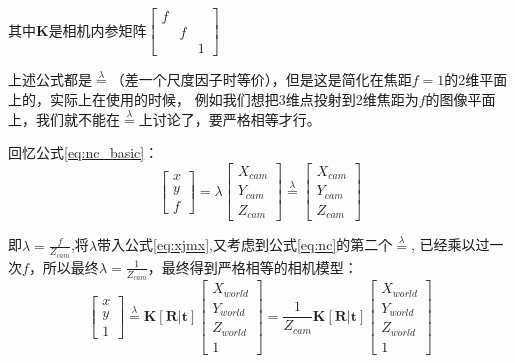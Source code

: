 \documentclass[12pt]{article}
\begin{document}
其中$\mathbf{K}$是相机内参矩阵$\left[\begin{array}{lll}
    f &&\\
    &f&\\
    &&1
\end{array}\right]$

上述公式都是$\overset{\lambda}{=}$（差一个尺度因子时等价），但是这是简化在焦距$f=1$的2维平面上的，实际上在使用的时候，
例如我们想把3维点投射到2维焦距为$f$的图像平面上，我们就不能在$\overset{\lambda}{=}$上讨论了，要严格相等才行。

回忆公式\ref{eq:nc_basic}：
\begin{equation}
    \nonumber
    \left[\begin{array}{l}
        x \\
        y \\
        f
        \end{array}\right]=\lambda\left[\begin{array}{l}
            X_{cam} \\
            Y_{cam} \\
            Z_{cam}
            \end{array}\right]
        \overset{\lambda}{=}\left[\begin{array}{l}
        X_{cam} \\
        Y_{cam} \\
        Z_{cam}
        \end{array}\right]
\end{equation}

即$\lambda=\frac{f}{Z_{cam}}$,将$\lambda$带入公式\ref{eq:xjmx},又考虑到公式\ref{eq:nc}的第二个$\overset{\lambda}{=}$,
已经乘以过一次$f$，所以最终$\lambda=\frac{1}{Z_{cam}}$，最终得到严格相等的相机模型：
\begin{equation}
    \left[
        \begin{array}{l}
            x \\
            y \\
            1
        \end{array}
    \right]\overset{\lambda}{=}
    \mathbf{K}\left[\mathbf{R|\mathbf{t}}\right]\left[
        \begin{array}{l}
            X_{world} \\
            Y_{world} \\
            Z_{world} \\
            1
        \end{array}
    \right]=\frac{1}{Z_{cam}}
    \mathbf{K}\left[\mathbf{R|\mathbf{t}}\right]\left[
        \begin{array}{l}
            X_{world} \\
            Y_{world} \\
            Z_{world} \\
            1
        \end{array}
    \right]
\end{equation}
\end{document}
